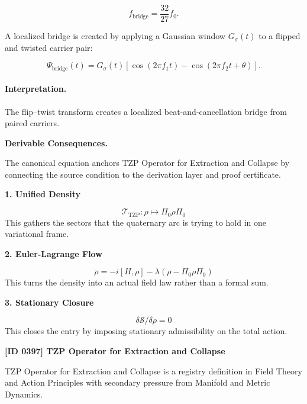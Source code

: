 \begin{equation}
f_{\mathrm{bridge}}=\frac{32}{27}f_0.
\end{equation}

A localized bridge is created by applying a Gaussian window $G_\sigma(t)$ to a flipped and twisted carrier pair:

\begin{equation}
\boxed{
\Psi_{\mathrm{bridge}}(t)
=
G_{\sigma}(t)
\left[
\cos(2\pi f_1t)
-
\cos(2\pi f_2t+\theta)
\right].
}
\end{equation}

\paragraph{Interpretation.}
The flip--twist transform creates a localized beat-and-cancellation bridge from paired carriers.

\par\vspace{0.35em}
\noindent\textbf{Derivable Consequences.}\quad
\begingroup
\footnotesize
\raggedright
The canonical equation anchors TZP Operator for Extraction and Collapse by connecting the source condition to the derivation layer and proof certificate.
\par\endgroup

\noindent\textbf{1. Unified Density}\par
\[
\mathcal{T}_{\mathrm{TZP}}:\rho\mapsto \Pi_{0}\rho\Pi_{0}
\]
\noindent This gathers the sectors that the quaternary arc is trying to hold in one variational frame.\par
\noindent\textbf{2. Euler-Lagrange Flow}\par
\[
\dot{\rho}=-i[H,\rho]-\lambda(\rho-\Pi_{0}\rho\Pi_{0})
\]
\noindent This turns the density into an actual field law rather than a formal sum.\par
\noindent\textbf{3. Stationary Closure}\par
\[
\delta\mathcal{S}/\delta\rho=0
\]
\noindent This closes the entry by imposing stationary admissibility on the total action.\par

\clearpage
\noindent\textbf{[ID 0397] TZP Operator for Extraction and Collapse}\par
\vspace{0.35em}
\begingroup\small
{}
TZP Operator for Extraction and Collapse is a registry definition in Field Theory and Action Principles with secondary pressure from Manifold and Metric Dynamics.


